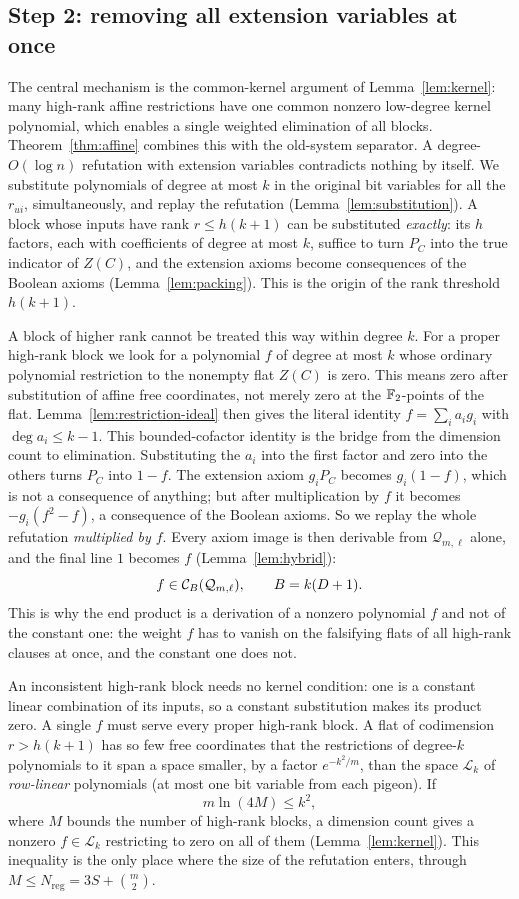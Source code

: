 \subsection{Step 2: removing all extension variables at once}
The central mechanism is the common-kernel argument of
Lemma~\ref{lem:kernel}: many high-rank affine restrictions have one common
nonzero low-degree kernel polynomial, which enables a single weighted
elimination of all blocks. Theorem~\ref{thm:affine} combines this with the
old-system separator. A degree-\(O(\log n)\) refutation with extension variables contradicts
nothing by itself. We substitute polynomials of degree at most \(k\) in the
original bit variables for all the \(r_{ui}\), simultaneously, and replay
the refutation (Lemma~\ref{lem:substitution}). A block whose inputs have
rank \(r\le h(k+1)\) can be substituted \emph{exactly}: its \(h\) factors,
each with coefficients of degree at most \(k\), suffice to turn \(P_C\) into
the true indicator of \(Z(C)\), and the extension axioms become consequences
of the Boolean axioms (Lemma~\ref{lem:packing}). This is the origin of the
rank threshold \(h(k+1)\).

A block of higher rank cannot be treated this way within degree \(k\).
For a proper high-rank block we look for a polynomial \(f\) of degree at
most \(k\) whose ordinary polynomial restriction to the nonempty flat
\(Z(C)\) is zero. This means zero after substitution of affine free
coordinates, not merely zero at the \(\mathbb F_2\)-points of the flat.
Lemma~\ref{lem:restriction-ideal} then gives the literal identity
\(f=\sum_ia_ig_i\) with \(\deg a_i\le k-1\). This bounded-cofactor
identity is the bridge from the dimension count to elimination.
Substituting the \(a_i\) into
the first factor and zero into the others turns \(P_C\) into \(1-f\). The
extension axiom \(g_iP_C\) becomes \(g_i(1-f)\), which is not a consequence
of anything; but after multiplication by \(f\) it becomes
\(-g_i(f^2-f)\), a consequence of the Boolean axioms. So we replay the
whole refutation \emph{multiplied by \(f\)}. Every axiom image is then
derivable from \(\mathcal Q_{m,\ell}\) alone, and the final line \(1\)
becomes \(f\) (Lemma~\ref{lem:hybrid}):
\[
 f\in\mathcal C_{B}(\mathcal Q_{m,\ell}),\qquad B=k(D+1).
\]
This is why the end product is a derivation of a nonzero polynomial \(f\)
and not of the constant one: the weight \(f\) has to vanish on the
falsifying flats of all high-rank clauses at once, and the constant one
does not.

An inconsistent high-rank block needs no kernel condition: one is a
constant linear combination of its inputs, so a constant substitution
makes its product zero. A single \(f\) must serve every proper high-rank block. A flat of codimension
\(r>h(k+1)\) has so few free coordinates that the restrictions of
degree-\(k\) polynomials to it span a space smaller, by a factor
\(e^{-k^2/m}\), than the space \(\mathcal L_k\) of \emph{row-linear}
polynomials (at most one bit variable from each pigeon). If
\[
 m\ln(4M)\le k^2,
\]
where \(M\) bounds the number of high-rank blocks, a dimension count gives a
nonzero \(f\in\mathcal L_k\) restricting to zero on all of them
(Lemma~\ref{lem:kernel}). This inequality is the only place where the size
of the refutation enters, through \(M\le N_{\mathrm{reg}}=3S+\binom m2\).

